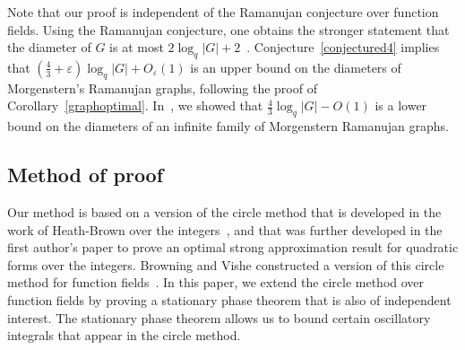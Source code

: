 \documentclass[10pt]{amsart}
\theoremstyle{plain}
\theoremstyle{plain}
\theoremstyle{remark}
\theoremstyle{definition}
\begin{document}
Note that our proof is independent of the Ramanujan conjecture over function fields. Using the Ramanujan conjecture, one obtains the stronger statement that the diameter of $G$ is at most $2\log_q|G|+2$~\cite{Morgenstern}. Conjecture~\ref{conjectured4} implies that $(\frac{4}{3}+\varepsilon)\log_q|G|+O_{\varepsilon}(1)$ is an upper bound on the diameters of Morgenstern's Ramanujan graphs, following the proof of Corollary~\ref{graphoptimal}. In~\cite{SZ2019}, we showed that $\frac{4}{3}\log_q|G|-O(1)$ is a lower bound on the diameters of an infinite family of Morgenstern Ramanujan graphs.
\subsection{Method of proof}
Our method is based on a version of the circle method that is developed in the work of Heath-Brown over the integers~\cite{Brown}, and that was further developed in the first author's paper \cite{Naser2} to prove an optimal strong approximation result for quadratic forms over the integers. Browning and Vishe constructed a version of this circle method for function fields~\cite{Browning}. In this paper, we extend the circle method over function fields by proving a stationary phase theorem that is also of independent interest. The stationary phase theorem allows us to bound certain oscillatory integrals that appear in the circle method. 
\\
\end{document}
